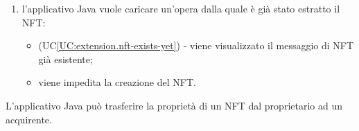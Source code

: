 \begin{itemize}
\begin{enumerate}[label=\lett]
    \item l'applicativo Java vuole caricare un'opera dalla quale è già stato estratto il NFT:
    \begin{itemize}
      \item (UC\ref{UC:extension.nft-exists-yet}) - viene visualizzato il messaggio di NFT già esistente;
      \item viene impedita la creazione del NFT.
    \end{itemize}
  \end{enumerate}
\end{itemize}


\label{UC:transfer-nft}

L'applicativo Java può trasferire la proprietà di un NFT dal proprietario ad un acquirente.


